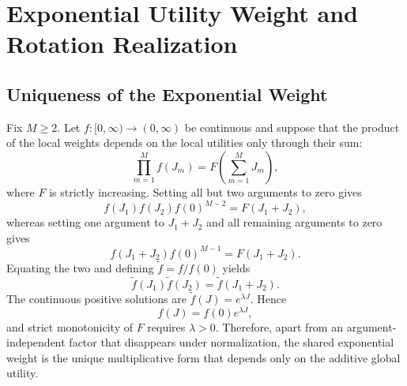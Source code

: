 \documentclass[journal]{IEEEtran}
\begin{document}



\appendices
\section{Exponential Utility Weight and Rotation Realization}
\label{app:exponential}

\subsection{Uniqueness of the Exponential Weight}

Fix $M\ge2$. Let $f:[0,\infty)\to(0,\infty)$ be continuous and suppose that the product of the local weights depends on the local utilities only through their sum:
\[
\prod_{m=1}^{M}f(J_m)
=
F\!\left(\sum_{m=1}^{M}J_m\right),
\]
where $F$ is strictly increasing. Setting all but two arguments to zero gives
\[
f(J_1)f(J_2)f(0)^{M-2}=F(J_1+J_2),
\]
whereas setting one argument to $J_1+J_2$ and all remaining arguments to zero gives
\[
f(J_1+J_2)f(0)^{M-1}=F(J_1+J_2).
\]
Equating the two and defining $\widetilde f=f/f(0)$ yields
\[
\widetilde f(J_1)\widetilde f(J_2)
=
\widetilde f(J_1+J_2).
\]
The continuous positive solutions are $\widetilde f(J)=e^{\lambda J}$. Hence
\[
f(J)=f(0)e^{\lambda J},
\]
and strict monotonicity of $F$ requires $\lambda>0$. Therefore, apart from an argument-independent factor that disappears under normalization, the shared exponential weight is the unique multiplicative form that depends only on the additive global utility.
\end{document}
